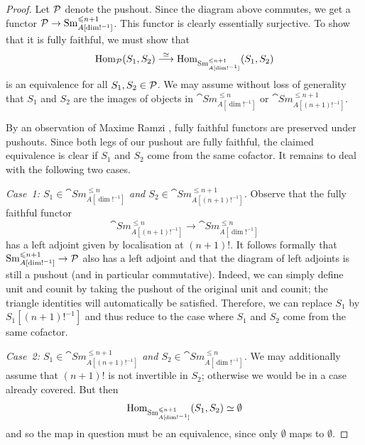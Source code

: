 \documentclass[DIV=12,numbers=enddot,leqno,bibliography=totoc]{scrartcl}
\begin{document}
	\begin{proof}
		Let $\mathcal{P}$ denote the pushout. Since the diagram above commutes, we get a functor $\mathcal{P}\rightarrow \mathrm{Sm}_{A[\dim!^{-1}]}^{\leqslant n+1}$. This functor is clearly essentially surjective. To show that it is fully faithful, we must show that
		\begin{equation*}
			\operatorname{Hom}_{\mathcal{P}}(S_1,S_2)\overset{\simeq}{\longrightarrow} \operatorname{Hom}_{\mathrm{Sm}_{A[\dim!^{-1}]}^{\leqslant n+1}}(S_1,S_2)
		\end{equation*}
		is an equivalence for all $S_1,S_2\in \mathcal{P}$. We may assume without loss of generality that $S_1$ and $S_2$ are the images of objects in $\cat{Sm}_{A[\dim!^{-1}]}^{\leqslant n}$ or $\cat{Sm}_{A[(n+1)!^{-1}]}^{\leqslant n+1}$.
		
		By an observation of Maxime Ramzi \cite{RamziPushouts}, fully faithful functors are preserved under pushouts. Since both legs of our pushout are fully faithful, the claimed equivalence is clear if $S_1$ and $S_2$ come from the same cofactor. It remains to deal with the following two cases.
		
		\emph{Case~1: $S_1\in \cat{Sm}_{A[\dim!^{-1}]}^{\leqslant n}$ and $S_2\in \cat{Sm}_{A[(n+1)!^{-1}]}^{\leqslant n+1}$.} Observe that the fully faithful functor
		\begin{equation*}
			\cat{Sm}_{A[(n+1)!^{-1}]}^{\leqslant n}\longrightarrow \cat{Sm}_{A[\dim!^{-1}]}^{\leqslant n}
		\end{equation*}
		has a left adjoint given by localisation at $(n+1)!$. It follows formally that $\mathrm{Sm}_{A[\dim!^{-1}]}^{\leqslant n+1}\rightarrow\mathcal{P}$ also has a left adjoint and that the diagram of left adjoints is still a pushout (and in particular commutative). Indeed, we can simply define unit and counit by taking the pushout of the original unit and counit; the triangle identities will automatically be satisfied. Therefore, we can replace $S_1$ by $S_1[(n+1)!^{-1}]$ and thus reduce to the case where $S_1$ and $S_2$ come from the same cofactor.
		
		\emph{Case~2: $S_1\in \cat{Sm}_{A[(n+1)!^{-1}]}^{\leqslant n+1}$ and $S_2\in \cat{Sm}_{A[\dim!^{-1}]}^{\leqslant n}$.} We may additionally assume that $(n+1)!$ is not invertible in $S_2$; otherwise we would be in a case already covered. But then
		\begin{equation*}
			\operatorname{Hom}_{\mathrm{Sm}_{A[\dim!^{-1}]}^{\leqslant n+1}}(S_1,S_2)\simeq\emptyset
		\end{equation*}
		and so the map in question must be an equivalence, since only $\emptyset$ maps to $\emptyset$.
	\end{proof}
	
\end{document}
